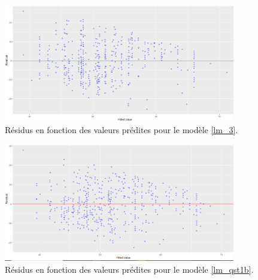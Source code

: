 \documentclass{article}
\begin{document}
\begin{figure}[H]  %
	\centering
	\includegraphics[width=0.9\textwidth]{graphiques/residus_VS_predicitions_lm2}
	\caption{Résidus en fonction des valeurs prédites pour le modèle \eqref{lm_3}.}
	\label{residus_VS_predicitions_lm3}
\end{figure}

\begin{figure}[H]  %
	\centering
\includegraphics[width=0.9\textwidth]{graphiques/residus_VS_predicitions_lm_Qst1b}
\caption{Résidus en fonction des valeurs prédites pour le modèle \eqref{lm_qst1b}.}
\label{residus_VS_predicitions_lm_Qst1b}
\end{figure}
\end{document}
